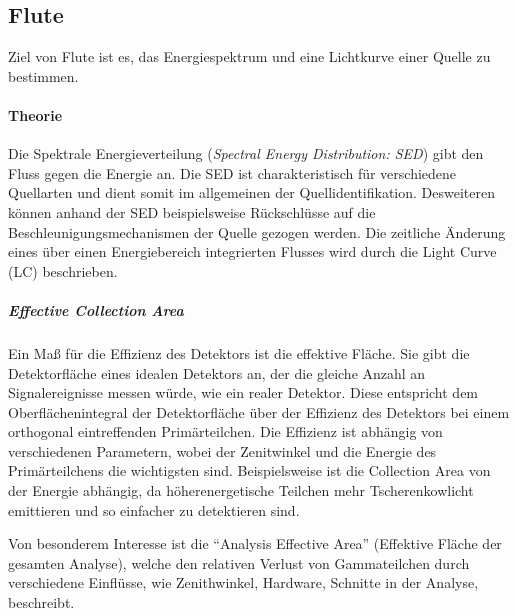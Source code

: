 \subsection{Flute}%
\label{sub:flute}

Ziel von Flute ist es,
das Energiespektrum und
eine Lichtkurve einer Quelle zu bestimmen.

\paragraph{Theorie}%

Die
Spektrale Energieverteilung (\textit{Spectral Energy Distribution: SED})
gibt den Fluss gegen die Energie an.
Die SED ist charakteristisch für verschiedene Quellarten 
und dient somit im allgemeinen der Quellidentifikation.
Desweiteren können anhand der SED beispielsweise Rückschlüsse auf die
Beschleunigungsmechanismen der Quelle gezogen werden.
Die zeitliche Änderung eines über einen Energiebereich integrierten Flusses wird durch die Light Curve (LC) beschrieben.

\subparagraph{Effective Collection Area}
Ein Maß für die Effizienz des Detektors ist die effektive Fläche.
Sie gibt die Detektorfläche eines idealen Detektors an,
der die gleiche Anzahl an Signalereignisse messen würde,
wie ein realer Detektor.
Diese entspricht dem Oberflächenintegral der Detektorfläche
über der Effizienz des Detektors
bei einem orthogonal eintreffenden Primärteilchen.
Die Effizienz ist abhängig von verschiedenen Parametern,
wobei der Zenitwinkel
und die Energie des Primärteilchens
die wichtigsten sind.
Beispielsweise ist die Collection Area von der Energie abhängig,
da höherenergetische Teilchen mehr Tscherenkowlicht emittieren
und so einfacher zu detektieren sind.

Von besonderem Interesse ist die \enquote{Analysis Effective Area}
(Effektive Fläche der gesamten Analyse),
welche den relativen Verlust von Gammateilchen durch verschiedene
Einflüsse, wie Zenithwinkel, Hardware, Schnitte in der Analyse,
beschreibt.

